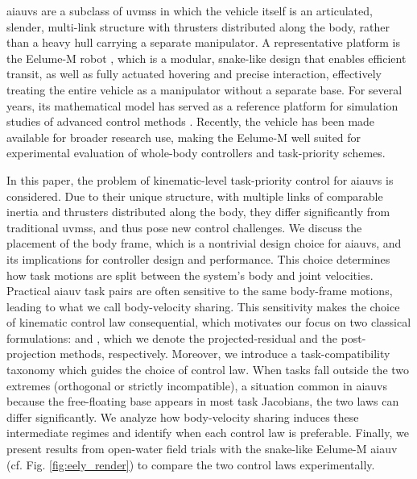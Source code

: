 \documentclass[../main.tex]{subfiles}
\begin{document}
\glspl{aiauv} are a subclass of \glspl{uvms} in which the vehicle itself is an articulated, slender, multi-link structure with thrusters distributed along the body, rather than a heavy hull carrying a separate manipulator. A representative platform is the Eelume-M robot \cite{liljeback2017}, which is a modular, snake-like design that enables efficient transit, as well as fully actuated hovering and precise interaction, effectively treating the entire vehicle as a manipulator without a separate base. For several years, its mathematical model has served as a reference platform for simulation studies of advanced control methods \cite{iversflaten2022,tveter2024,iversflaten2023,saebo2022,wrzos-kaminska2024}. Recently, the vehicle has been made available for broader research use, making the Eelume-M well suited for experimental evaluation of whole-body controllers and task-priority schemes.


In this paper, the problem of kinematic-level task-priority control for \glspl{aiauv} is considered. Due to their unique structure, with multiple links of comparable inertia and thrusters distributed along the body, they differ significantly from traditional \glspl{uvms}, and thus pose new control challenges. We discuss the placement of the body frame, which is a nontrivial design choice for \glspl{aiauv}, and its implications for controller design and performance. This choice determines how task motions are split between the system's body and joint velocities. Practical \gls{aiauv} task pairs are often sensitive to the same body-frame motions, leading to what we call body-velocity sharing. This sensitivity makes the choice of kinematic control law consequential, which motivates our focus on two classical formulations: \cite{nakamura1987} and \cite{chiaverini1997}, which we denote the projected-residual and the post-projection methods, respectively. Moreover, we introduce a task-compatibility taxonomy which guides the choice of control law. When tasks fall outside the two extremes (orthogonal or strictly incompatible), a situation common in \glspl{aiauv} because the free-floating base appears in most task Jacobians, the two laws can differ significantly. We analyze how body-velocity sharing induces these intermediate regimes and identify when each control law is preferable. Finally, we present results from open-water field trials with the snake-like Eelume-M \gls{aiauv} (cf. Fig. \ref{fig:eely_render}) to compare the two control laws experimentally.
\end{document}
